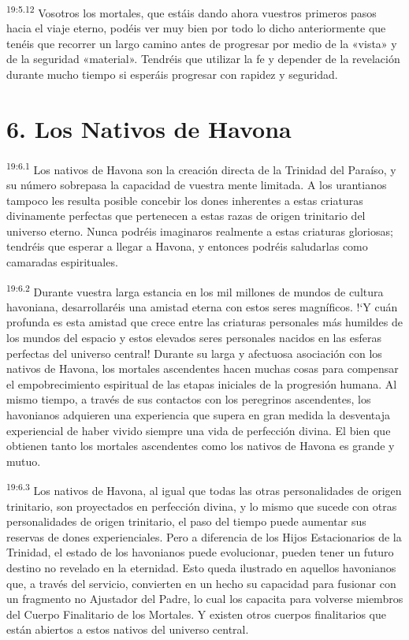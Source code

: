 \par
\textsuperscript{19:5.12} Vosotros los mortales, que estáis dando ahora vuestros primeros pasos hacia el viaje eterno, podéis ver muy bien por todo lo dicho anteriormente que tenéis que recorrer un largo camino antes de progresar por medio de la «vista» y de la seguridad «material». Tendréis que utilizar la fe y depender de la revelación durante mucho tiempo si esperáis progresar con rapidez y seguridad.

\section*{6. Los Nativos de Havona}
\par
\textsuperscript{19:6.1} Los nativos de Havona son la creación directa de la Trinidad del Paraíso, y su número sobrepasa la capacidad de vuestra mente limitada. A los urantianos tampoco les resulta posible concebir los dones inherentes a estas criaturas divinamente perfectas que pertenecen a estas razas de origen trinitario del universo eterno. Nunca podréis imaginaros realmente a estas criaturas gloriosas; tendréis que esperar a llegar a Havona, y entonces podréis saludarlas como camaradas espirituales.

\par
\textsuperscript{19:6.2} Durante vuestra larga estancia en los mil millones de mundos de cultura havoniana, desarrollaréis una amistad eterna con estos seres magníficos. !`Y cuán profunda es esta amistad que crece entre las criaturas personales más humildes de los mundos del espacio y estos elevados seres personales nacidos en las esferas perfectas del universo central! Durante su larga y afectuosa asociación con los nativos de Havona, los mortales ascendentes hacen muchas cosas para compensar el empobrecimiento espiritual de las etapas iniciales de la progresión humana. Al mismo tiempo, a través de sus contactos con los peregrinos ascendentes, los havonianos adquieren una experiencia que supera en gran medida la desventaja experiencial de haber vivido siempre una vida de perfección divina. El bien que obtienen tanto los mortales ascendentes como los nativos de Havona es grande y mutuo.

\par
\textsuperscript{19:6.3} Los nativos de Havona, al igual que todas las otras personalidades de origen trinitario, son proyectados en perfección divina, y lo mismo que sucede con otras personalidades de origen trinitario, el paso del tiempo puede aumentar sus reservas de dones experienciales. Pero a diferencia de los Hijos Estacionarios de la Trinidad, el estado de los havonianos puede evolucionar, pueden tener un futuro destino no revelado en la eternidad. Esto queda ilustrado en aquellos havonianos que, a través del servicio, convierten en un hecho su capacidad para fusionar con un fragmento no Ajustador del Padre, lo cual los capacita para volverse miembros del Cuerpo Finalitario de los Mortales. Y existen otros cuerpos finalitarios que están abiertos a estos nativos del universo central.

